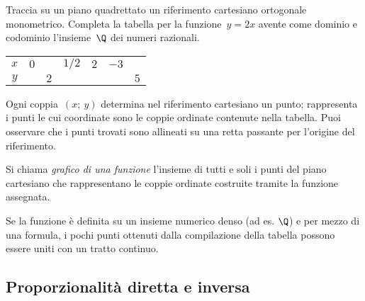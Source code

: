  \begin{esempio}
Traccia su un piano quadrettato un riferimento cartesiano ortogonale 
monometrico.
Completa la tabella per la funzione~\(y=2x\) avente come dominio e codominio 
l'insieme~\(\Q\) dei numeri razionali.
\begin{center}
 \begin{tabular}{ccccccc}
 \toprule
 \(x\) & \(0\) && \(1/2\) & \(2\) & \(-3\) &\\
 \(y\) &&\(2\)&&&&\(5\)\\
 \bottomrule
 \end{tabular}
\end{center}
Ogni coppia~\((x;~y)\) determina nel riferimento cartesiano un punto; 
rappresenta i punti le cui coordinate sono le coppie ordinate contenute nella 
tabella. 
Puoi osservare che i punti trovati sono allineati su una retta passante per 
l'origine del riferimento.
 \end{esempio}
 
\begin{definizione}
Si chiama \emph{grafico di una funzione} l'insieme di tutti e soli i punti 
del piano cartesiano che  rappresentano le coppie ordinate costruite tramite 
la funzione assegnata.
\end{definizione}
\osservazione
Se la funzione è definita su un insieme numerico denso (ad es. \(\Q\)) e per 
mezzo di una formula, i pochi punti ottenuti dalla compilazione della tabella 
possono essere uniti con un tratto continuo.


\subsection{Proporzionalità diretta e inversa}
\label{subsec:fun_proporzionalita}

